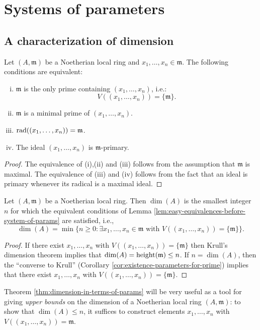 \documentclass[reqno]{amsart}
\begin{document}
\section{Systems of parameters}
\label{sec:orgfa54a11}
\subsection{A characterization of dimension}
\label{sec:org815b8ba}

\begin{lemma}\label{lem:easy-equivalences-before-system-of-params}
  Let $(A,\mathfrak{m})$ be a Noetherian local ring
  and $x_1,\dotsc,x_n \in \mathfrak{m}$.
  The following conditions are equivalent:
  \begin{enumerate}[(i)]
  \item $\mathfrak{m}$ is the only prime containing
    $(x_1,\dotsc,x_n)$,
    i.e.:
    \[
    V((x_1,\dotsc,x_n)) = \{\mathfrak{m}\}.
    \]
  \item $\mathfrak{m}$ is a minimal prime of $(x_1,\dotsc,x_n)$.
  \item $\operatorname{rad}((x_1,\dotsc,x_n)) = \mathfrak{m}$.
  \item The ideal $(x_1,\dotsc,x_n)$ is $\mathfrak{m}$-primary.
  \end{enumerate}
\end{lemma}
\begin{proof}
  The equivalence of (i),(ii) and (iii) follows from the
  assumption that $\mathfrak{m}$ is maximal.  The equivalence of
  (iii) and (iv) follows from the fact that
  an ideal is primary whenever its radical is a maximal ideal.
\end{proof}

\begin{theorem}\label{thm:dimension-in-terms-of-params}
  Let $(A,\mathfrak{m})$ be a Noetherian local ring.
  Then
  $\dim(A)$ is the smallest integer $n$ for which the equivalent
  conditions of
  Lemma
  \ref{lem:easy-equivalences-before-system-of-params}
  are satisfied,
  i.e.,
  \[
  \dim(A) = \min \{n \geq 0 : \exists
  x_1,\dotsc,x_n \in \mathfrak{m}
  \text{ with }
  V((x_1,\dotsc,x_n)) = \{\mathfrak{m} \}
  \}.
  \]
\end{theorem}
\begin{proof}
  If there exist
  $x_1,\dotsc,x_n$ with $V((x_1,\dotsc,x_n)) =
  \{\mathfrak{m} \}$
  then
  Krull's dimension theorem implies that
  $\dim(A) = \operatorname{height}(\mathfrak{m}) \leq n$.
  If $n = \dim(A)$,
  then
  the ``converse to Krull'' (Corollary \ref{cor:existence-parameters-for-prime})
  implies that there exist
  $x_1,\dotsc,x_n$ with $V((x_1,\dotsc,x_n)) =
  \{\mathfrak{m} \}$.
\end{proof}
Theorem \ref{thm:dimension-in-terms-of-params} will be very useful
as a tool for giving \emph{upper bounds} on the dimension
of a Noetherian local ring \((A,\mathfrak{m})\):
to show that \(\dim(A) \leq n\), it suffices
to construct elements \(x_1,\dotsc,x_n\)
with \(V((x_1,\dotsc,x_n)) = \mathfrak{m}\).
\end{document}
